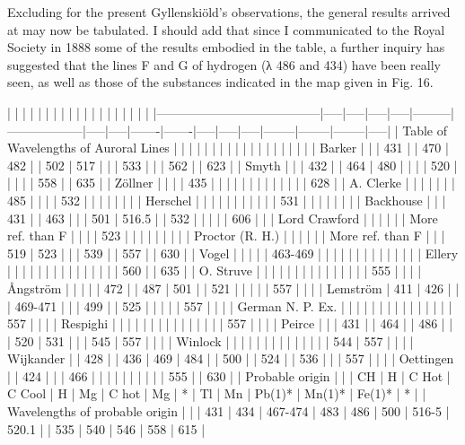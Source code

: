 \documentclass[a4paper, 12pt, oneside, polutonikogreek, english]{article}
\begin{document}
Excluding for the present Gyllenskiöld's observations, the general results arrived at may now be tabulated. I should add that since I communicated to the Royal Society in 1888 some of the results embodied in the table, a further inquiry has suggested that the lines F and G of hydrogen (λ 486 and 434) have been really seen, as well as those of the substances indicated in the map given in Fig. 16.

|                    |   |   |   |   |     |         |   |   |    |    |   |   |   |    |    |    |   |
|---------------------------------------|-----|-----|-----|-----|---------|------------------|-----|-----|-------|-------|-----|-----|-----|--------|--------|--------|-----|
| Table of Wavelengths of Auroral Lines |   |   |   |   |     |         |   |   |    |    |   |   |   |    |    |    |   |
| Barker                |   |   | 431 |   | 470   | 482       |   | 502 | 517  |    |   | 533 |   |    | 562  |    | 623 |
| Smyth                 |   |   | 432 |   | 464   | 480       |   |   |    | 520  |   |   |   |    | 558  |    | 635 |
| Zöllner                |   |   |   | 435 |     |         |   |   |    |    |   |   |   |    |    |    | 628 |
| A. Clerke               |   |   |   |   |     |         | 485 |   |    |    | 532 |   |   |    |    |    |   |
| Herschel               |   |   |   |   |     |         |   |   |    |    | 531 |   |   |    |    |    |   |
| Backhouse               |   |   | 431 |   | 463   |         |   | 501 | 516.5 |    | 532 |   |   |    |    | 606  |   |
| Lord Crawford             |   |   |   |   |     | More ref. than F |   |   |    | 523  |   |   |   |    |    |    |   |
| Proctor (R. H.)            |   |   |   |   |     | More ref. than F |   |   | 519  | 523  |   |   | 539 |    | 557  |    | 630 |
| Vogel                 |   |   |   |   | 463-469 |         |   |   |    |    |   |   |   |    |    |    |   |
| Ellery                |   |   |   |   |     |         |   |   |    |    |   |   |   |    | 560  |    | 635 |
| O. Struve               |   |   |   |   |     |         |   |   |    |    |   |   |   |    | 555  |    |   |
| Ångström               |   |   |   |   | 472   |         | 487 | 501 |    | 521  |   |   |   |    | 557  |    |   |
| Lemström               | 411 | 426 |   |   | 469-471 |         |   | 499 |    | 525  |   |   |   |    | 557  |    |   |
| German N. P. Ex.           |   |   |   |   |     |         |   |   |    |    |   |   |   |    | 557  |    |   |
| Respighi               |   |   |   |   |     |         |   |   |    |    |   |   |   |    | 557  |    |   |
| Peirce                |   |   | 431 |   | 464   |         | 486 |   |    | 520  | 531 |   |   | 545  | 557  |    |   |
| Winlock                |   |   |   |   |     |         |   |   |    |    |   |   |   | 544  | 557  |    |   |
| Wijkander               |   | 428 |   | 436 | 469   | 484       |   | 500 |    | 524  |   | 536 |   |    | 557  |    |   |
| Oettingen               |   | 424 |   |   | 466   |         |   |   |    |    |   |   |   |    | 555  |    | 630 |
| Probable origin            |   |   | CH | H  | C Hot  | C Cool      | H  | Mg | C hot | Mg  | *  | Tl | Mn | Pb(1)* | Mn(1)* | Fe(1)* | *  |
| Wavelengths of probable origin    |   |   | 431 | 434 | 467-474 | 483       | 486 | 500 | 516-5 | 520.1 |   | 535 | 540 | 546  | 558  | 615  |
\end{document}
